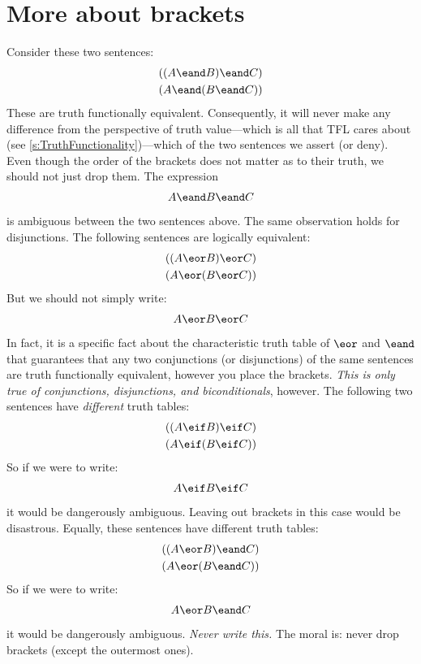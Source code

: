 \section{More about brackets}\label{s:MoreBracketingConventions}
Consider these two sentences:
	\begin{align*}
		((A \eand B) \eand C)\\
		(A \eand (B \eand C))
	\end{align*}
These are truth functionally equivalent. Consequently, it will never make any difference from the perspective of truth value---which is all that TFL cares about (see \cref{s:TruthFunctionality})---which of the two sentences we assert (or deny). Even though the order of the brackets does not matter as to their truth, we should not just drop them. The expression
	\begin{align*}
		A \eand B \eand C
	\end{align*}
is ambiguous between the two sentences above.  The same observation holds for disjunctions. The following sentences are logically equivalent:
	\begin{align*}
		((A \eor B) \eor C)\\
		(A \eor (B \eor C))
	\end{align*}
But we should not simply write:
	\begin{align*}
		A \eor B \eor C
	\end{align*}
In fact, it is a specific fact about the characteristic truth table of
$\eor$ and $\eand$ that guarantees that any two conjunctions (or
disjunctions) of the same sentences are truth functionally equivalent,
however you place the brackets. \emph{This is only true of
conjunctions, disjunctions, and biconditionals}, however. The following two sentences
have \emph{different} truth tables:
	\begin{align*}
		((A \eif B) \eif C)\\
		(A \eif (B \eif C))
	\end{align*}
So if we were to write:
	\begin{align*}
		A \eif B \eif C
	\end{align*}
it would be dangerously ambiguous. Leaving out brackets in this case would be disastrous. Equally, these sentences have different truth tables:
	\begin{align*}
		((A \eor B) \eand C)\\
		(A \eor (B \eand C))
	\end{align*}
So if we were to write:
	\begin{align*}
		A \eor B \eand C
	\end{align*}
it would be dangerously ambiguous. \emph{Never write this.} The moral is: never drop brackets (except the outermost ones).

